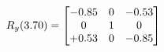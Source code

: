 \documentclass[preview]{standalone}
\begin{document}
\begin{align*}
\special{dvisvgm:raw <g id='unique000'>}R_{y}(3.70) = \begin{bmatrix}-0.85 & 0 & -0.53 \\0 & 1 & 0 \\+0.53 & 0 & -0.85\end{bmatrix}\special{dvisvgm:raw </g>}
\end{align*}
\end{document}
